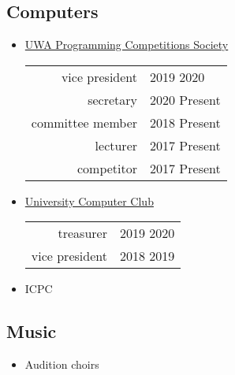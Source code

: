 \documentclass[a4paper]{style}
\begin{document}
\begin{minipage}[t]{0.45\textwidth}
\subsection{Computers}
\vspace{5pt}
\begin{itemize}
    \item \href{https://pcs.org.au/about/}{UWA Programming Competitions Society}
        \begin{tabular}{r|l}
            vice president & 2019 \textendash{} 2020 \\
            secretary & 2020 \textendash{} Present \\
            committee member & 2018 \textendash{} Present \\
            lecturer & 2017 \textendash{} Present \\
            competitor & 2017 \textendash{} Present
        \end{tabular}
    \item \href{https://ucc.asn.au}{University Computer Club} \\
        \begin{tabular}{r|l}
            \hspace{20pt} treasurer & 2019 \textendash{} 2020 \\
            \hspace{22pt} vice president & 2018 \textendash{} 2019
        \end{tabular}
    \item ICPC
\end{itemize}
\subsection{Music}
\begin{itemize}
    \item Audition choirs
\end{itemize}


\end{minipage}
\end{document}
